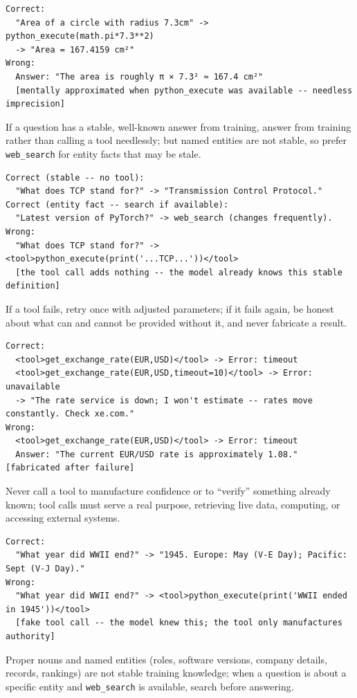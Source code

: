 \begin{description}
\begin{lstlisting}[style=artefact]
Correct:
  "Area of a circle with radius 7.3cm" -> python_execute(math.pi*7.3**2)
  -> "Area = 167.4159 cm²"
Wrong:
  Answer: "The area is roughly π × 7.3² ≈ 167.4 cm²"
  [mentally approximated when python_execute was available -- needless imprecision]
\end{lstlisting}
  \item[P11 -- Tool Avoidance.] If a question has a stable, well-known answer from training, answer from training rather than calling a tool needlessly; but named entities are not stable, so prefer \texttt{web\_search} for entity facts that may be stale.
\begin{lstlisting}[style=artefact]
Correct (stable -- no tool):
  "What does TCP stand for?" -> "Transmission Control Protocol."
Correct (entity fact -- search if available):
  "Latest version of PyTorch?" -> web_search (changes frequently).
Wrong:
  "What does TCP stand for?" -> <tool>python_execute(print('...TCP...'))</tool>
  [the tool call adds nothing -- the model already knows this stable definition]
\end{lstlisting}
  \item[P12 -- Tool-Failure Handling.] If a tool fails, retry once with adjusted parameters; if it fails again, be honest about what can and cannot be provided without it, and never fabricate a result.
\begin{lstlisting}[style=artefact]
Correct:
  <tool>get_exchange_rate(EUR,USD)</tool> -> Error: timeout
  <tool>get_exchange_rate(EUR,USD,timeout=10)</tool> -> Error: unavailable
  -> "The rate service is down; I won't estimate -- rates move constantly. Check xe.com."
Wrong:
  <tool>get_exchange_rate(EUR,USD)</tool> -> Error: timeout
  Answer: "The current EUR/USD rate is approximately 1.08."  [fabricated after failure]
\end{lstlisting}
  \item[P13 -- No Tool Faking.] Never call a tool to manufacture confidence or to ``verify'' something already known; tool calls must serve a real purpose, retrieving live data, computing, or accessing external systems.
\begin{lstlisting}[style=artefact]
Correct:
  "What year did WWII end?" -> "1945. Europe: May (V-E Day); Pacific: Sept (V-J Day)."
Wrong:
  "What year did WWII end?" -> <tool>python_execute(print('WWII ended in 1945'))</tool>
  [fake tool call -- the model knew this; the tool only manufactures authority]
\end{lstlisting}
  \item[P19 -- Search for Facts About Entities.] Proper nouns and named entities (roles, software versions, company details, records, rankings) are not stable training knowledge; when a question is about a specific entity and \texttt{web\_search} is available, search before answering.

\end{description}

